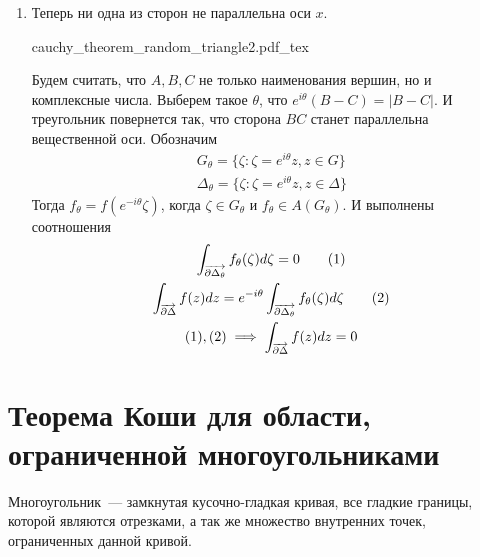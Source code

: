 \documentclass[main]{subfiles}
\begin{document}
\begin{longProof}
\begin{enumerate}
        \item Теперь ни одна из сторон не параллельна оси $x$.
              \begin{center}
                  \def\svgwidth{0.45\linewidth}
                  {cauchy_theorem_random_triangle2.pdf_tex}
              \end{center}
              Будем считать, что $A,B,C$ не только наименования вершин, но и комплексные числа.
              Выберем такое $\theta$, что $e^{i\theta}(B-C) = |B - C|$.
              И треугольник повернется так, что сторона $BC$ станет параллельна вещественной оси.
              Обозначим
              \begin{gather*}
                  G_\theta = \{\zeta: \zeta = e^{i \theta}z, z \in G\} \\
                  \Delta_\theta = \{\zeta: \zeta = e^{i \theta}z, z \in \Delta\}
              \end{gather*}
              Тогда $f_\theta = f(e^{- i \theta} \zeta)$, когда $\zeta \in G_\theta$ и $f_\theta \in A (G_\theta)$.
              И выполнены  соотношения
              \begin{gather*}
                  \AnClOrInt[\AnClOrCurve[\partial \Delta_\theta]] f_\theta(\zeta) d\zeta = 0 \tag{1}\\
                  \AnClOrInt[\AnClOrCurve[\partial \Delta]] f(z) dz = e^{-i \theta}\AnClOrInt[\AnClOrCurve[\partial \Delta_\theta]] f_\theta(\zeta) d\zeta \tag{2}\\
                  (1), (2) \implies \int_{\overrightarrow{\partial \Delta}} f(z) dz = 0
              \end{gather*}
    \end{enumerate}
\end{longProof}

\section{Теорема Коши для области, ограниченной многоугольниками}
\begin{definition}[Многоугольник]
    Многоугольник~--- замкнутая кусочно-гладкая кривая, все гладкие границы, которой являются отрезками, а так же множество внутренних точек, ограниченных данной кривой.
\end{definition}
\end{document}
